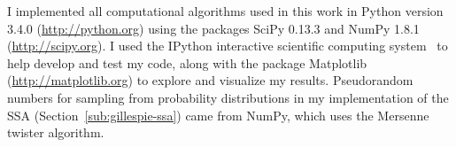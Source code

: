 \documentclass[english,letterpaper,12pt]{report}
\begin{document}
\begin{doublespacing}
I implemented all computational algorithms used in this work in Python version 3.4.0 (\url{http://python.org}) using the packages SciPy 0.13.3 and NumPy 1.8.1 (\url{http://scipy.org}). I used the IPython interactive scientific computing system~\cite{PER-GRA:2007} to help develop and test my code, along with the package Matplotlib (\url{http://matplotlib.org}) to explore and visualize my results. Pseudorandom numbers for sampling from probability distributions in my implementation of the SSA (Section~\ref{sub:gillespie-ssa}) came from NumPy, which uses the Mersenne twister algorithm.




\end{doublespacing}



\end{document}
